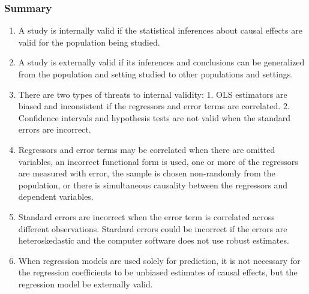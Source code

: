 

\begin{frame}
\frametitle{Summary}
\begin{enumerate}
\item A study is internally valid if the statistical inferences about causal effects are valid for the population being studied. 
\item A study is externally valid if its inferences and conclusions can be generalized from the population and setting studied to other populations and settings.
\item There are two types of threats to internal validity: 1. OLS estimators are biased and inconsistent if the regressors and error terms are correlated. 2. Confidence intervals and hypothesis tests are not valid when the standard errors are incorrect.
\item Regressors and error terms may be correlated when there are omitted variables, an incorrect functional form is used, one or more of the regressors are measured with error, the sample is chosen non-randomly from the population, or there is simultaneous causality between the regressors and dependent variables.
\item Standard errors are incorrect when the error term is correlated across different observations. Stardard errors could be incorrect if the errors are heteroskedastic and the computer software does not use robust estimates.
\item When regression models are used solely for prediction, it is not necessary for the regression coefficients to be unbiased estimates of causal effects, but the regression model be externally valid.
\end{enumerate}
\end{frame}
